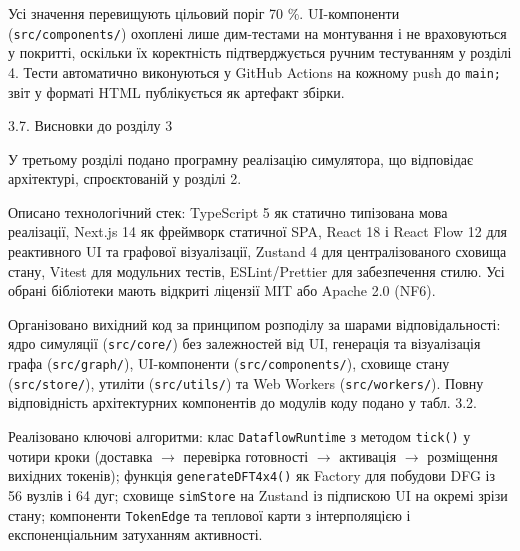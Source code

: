\documentclass[
]{article}
\newcommand{\passthrough}[1]{#1}
\begin{document}
Усі значення перевищують цільовий поріг 70 \%. UI-компоненти
(\passthrough{\lstinline!src!}\passthrough{\lstinline!/!}\passthrough{\lstinline!components!}\passthrough{\lstinline!/!})
охоплені лише дим-тестами на монтування і не враховуються у покритті,
оскільки їх коректність підтверджується ручним тестуванням у розділі 4.
Тести автоматично виконуються у GitHub Actions на кожному push до
\passthrough{\lstinline!main!}\passthrough{\lstinline!;!}\passthrough{\lstinline! !}звіт
у форматі HTML публікується як артефакт збірки.

\protect{}\label{X17d74082d0a87aa1b85234bfe942da3cb20d5dd}{}3.7.
Висновки до розділу 3

У третьому розділі подано програмну реалізацію симулятора, що відповідає
архітектурі, спроєктованій у розділі 2.

Описано технологічний стек: TypeScript 5 як статично типізована мова
реалізації, Next.js 14 як фреймворк статичної SPA, React 18 і React Flow
12 для реактивного UI та графової візуалізації, Zustand 4 для
централізованого сховища стану, Vitest для модульних тестів,
ESLint/Prettier для забезпечення стилю. Усі обрані бібліотеки мають
відкриті ліцензії MIT або Apache 2.0 (NF6).

Організовано вихідний код за принципом розподілу за шарами
відповідальності: ядро симуляції
(\passthrough{\lstinline!src!}\passthrough{\lstinline!/!}\passthrough{\lstinline!core!}\passthrough{\lstinline!/!})
без залежностей від UI, генерація та візуалізація графа
(\passthrough{\lstinline!src!}\passthrough{\lstinline!/!}\passthrough{\lstinline!graph!}\passthrough{\lstinline!/!}),
UI-компоненти
(\passthrough{\lstinline!src!}\passthrough{\lstinline!/!}\passthrough{\lstinline!components!}\passthrough{\lstinline!/!}),
сховище стану
(\passthrough{\lstinline!src!}\passthrough{\lstinline!/!}\passthrough{\lstinline!store!}\passthrough{\lstinline!/!}),
утиліти
(\passthrough{\lstinline!src!}\passthrough{\lstinline!/!}\passthrough{\lstinline!utils!}\passthrough{\lstinline!/!})
та Web Workers
(\passthrough{\lstinline!src!}\passthrough{\lstinline!/!}\passthrough{\lstinline!workers!}\passthrough{\lstinline!/!}).
Повну відповідність архітектурних компонентів до модулів коду подано у
табл. 3.2.

Реалізовано ключові алгоритми: клас
\passthrough{\lstinline!DataflowRuntime!} з методом
\passthrough{\lstinline!tick!}\passthrough{\lstinline!()!} у чотири
кроки (доставка \(\rightarrow\) перевірка готовності \(\rightarrow\)
активація \(\rightarrow\) розміщення вихідних токенів); функція
\passthrough{\lstinline!generateDFT!}\passthrough{\lstinline!4!}\passthrough{\lstinline!x!}\passthrough{\lstinline!4()!}
як Factory для побудови DFG із 56 вузлів і 64 дуг; сховище
\passthrough{\lstinline!simStore!} на Zustand із підпискою UI на окремі
зрізи стану; компоненти \passthrough{\lstinline!TokenEdge!} та теплової
карти з інтерполяцією і експоненціальним затуханням активності.
\end{document}
